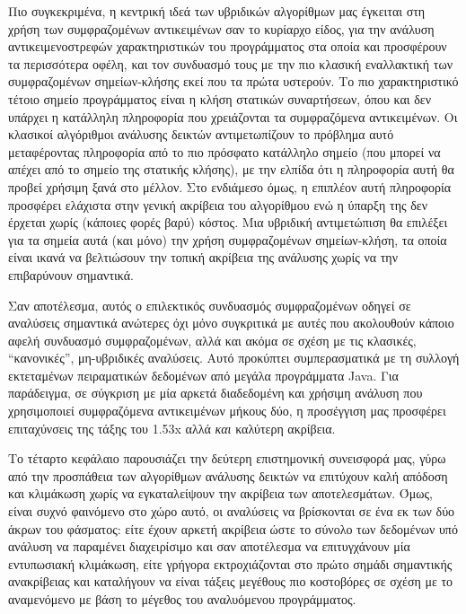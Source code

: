 Πιο συγκεκριμένα, η κεντρική ιδεά των υβριδικών αλγορίθμων μας έγκειται στη χρήση των συμφραζομένων αντικειμένων σαν το κυρίαρχο είδος, για την ανάλυση αντικειμενοστρεφών χαρακτηριστικών του προγράμματος στα οποία και προσφέρουν τα περισσότερα οφέλη, και τον συνδυασμό τους με την πιο κλασική εναλλακτική των συμφραζομένων σημείων-κλήσης εκεί που τα πρώτα υστερούν. Το πιο χαρακτηριστικό τέτοιο σημείο προγράμματος είναι η κλήση στατικών συναρτήσεων, όπου και δεν υπάρχει η κατάλληλη πληροφορία που χρειάζονται τα συμφραζόμενα αντικειμένων. Οι κλασικοί αλγόριθμοι ανάλυσης δεικτών αντιμετωπίζουν το πρόβλημα αυτό μεταφέροντας πληροφορία από το πιο πρόσφατο κατάλληλο σημείο (που μπορεί να απέχει από το σημείο της στατικής κλήσης), με την ελπίδα ότι η πληροφορία αυτή θα προβεί χρήσιμη ξανά στο μέλλον. Στο ενδιάμεσο όμως, η επιπλέον αυτή πληροφορία προσφέρει ελάχιστα στην γενική ακρίβεια του αλγορίθμου ενώ η ύπαρξη της δεν έρχεται χωρίς (κάποιες φορές βαρύ) κόστος. Μια υβριδική αντιμετώπιση θα επιλέξει για τα σημεία αυτά (και μόνο) την χρήση συμφραζομένων σημείων-κλήση, τα οποία είναι ικανά να βελτιώσουν την τοπική ακρίβεια της ανάλυσης χωρίς να την επιβαρύνουν σημαντικά.

Σαν αποτέλεσμα, αυτός ο επιλεκτικός συνδυασμός συμφραζομένων οδηγεί σε αναλύσεις σημαντικά ανώτερες όχι μόνο συγκριτικά με αυτές που ακολουθούν κάποιο αφελή συνδυασμό συμφραζομένων, αλλά και ακόμα σε σχέση με τις κλασικές, ``κανονικές'', μη-υβριδικές αναλύσεις. Αυτό προκύπτει συμπερασματικά με τη συλλογή εκτεταμένων πειραματικών δεδομένων από μεγάλα προγράμματα {\en Java}. Για παράδειγμα, σε σύγκριση με μία αρκετά διαδεδομένη και χρήσιμη ανάλυση που χρησιμοποιεί συμφραζόμενα αντικειμένων μήκους δύο, η προσέγγιση μας προσφέρει επιταχύνσεις της τάξης του {\en 1.53x} αλλά \emph{και} καλύτερη ακρίβεια.


Το τέταρτο κεφάλαιο παρουσιάζει την δεύτερη επιστημονική συνεισφορά μας, γύρω από την προσπάθεια των αλγορίθμων ανάλυσης δεικτών να επιτύχουν καλή απόδοση και κλιμάκωση χωρίς να εγκαταλείψουν την ακρίβεια των αποτελεσμάτων. Όμως, είναι συχνό φαινόμενο στο χώρο αυτό, οι αναλύσεις να βρίσκονται σε ένα εκ των δύο άκρων του φάσματος: είτε έχουν αρκετή ακρίβεια ώστε το σύνολο των δεδομένων υπό ανάλυση να παραμένει διαχειρίσιμο και σαν αποτέλεσμα να επιτυγχάνουν μία εντυπωσιακή κλιμάκωση, είτε γρήγορα εκτροχιάζονται στο πρώτο σημάδι σημαντικής ανακρίβειας και καταλήγουν να \mbox{είναι} τάξεις μεγέθους πιο κοστοβόρες σε σχέση με το αναμενόμενο με βάση το μέγεθος του αναλυόμενου προγράμματος.

